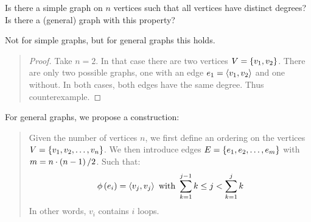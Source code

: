 \documentclass{article}
\begin{document}
\begin{exercise}
Is there a simple graph on $n$ vertices such that all vertices have distinct degrees? Is there a (general) graph with this property?
\begin{answer}
Not for simple graphs, but for general graphs this holds.
\begin{quote}\begin{proof}
Take $n=2$. In that case there are two vertices $V=\left\{ v_1,v_2 \right\}$. There are only two possible graphs, one with an edge $e_1=\left\langle v_1,v_2 \right\rangle$ and one without. In both cases, both edges have the same degree. Thus counterexample.
\end{proof}\end{quote}
For general graphs, we propose a construction:
\begin{quote}\begin{construction}
Given the number of vertices $n$, we first define an ordering on the vertices $V=\left\{ v_1,v_2,\ldots,v_n \right\}$. We then introduce edges $E=\left\{ e_1,e_2,\ldots,e_m \right\}$ with $m=n\cdot\left( n-1 \right)/2$. Such that:
\begin{equation}
\phi\left( e_i \right)=\left\langle v_j,v_j \right\rangle\mbox{ with }\displaystyle\sum_{k=1}^{j-1}{k}\leq j<\displaystyle\sum_{k=1}^{j}{k}
\end{equation}
In other words, $v_i$ contains $i$ loops.
\end{construction}\end{quote}
\end{answer}
\end{exercise}
\end{document}

